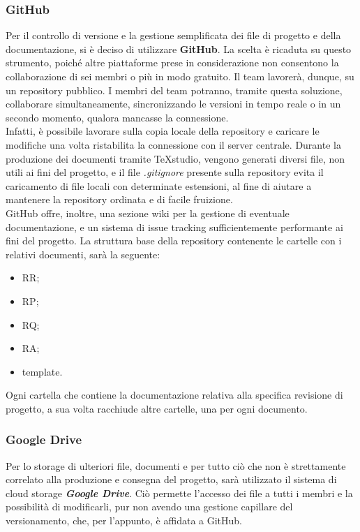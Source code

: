 		\subsubsection{GitHub}
		Per il controllo di versione e la gestione semplificata dei file di progetto e della documentazione, si è deciso di utilizzare \textbf{GitHub}. La scelta è ricaduta su questo strumento, poiché altre piattaforme prese in considerazione non consentono la collaborazione di sei membri o più in modo gratuito. Il team lavorerà, dunque, su un repository pubblico. I membri del team potranno, tramite questa soluzione, collaborare simultaneamente, sincronizzando le versioni in tempo reale o in un secondo momento, qualora mancasse la connessione.\\
		Infatti, è possibile lavorare sulla copia locale della repository e caricare le modifiche una volta ristabilita la connessione con il server centrale. Durante la produzione dei documenti tramite TeXstudio, vengono generati diversi file, non utili ai fini del progetto, e il file \textit{.gitignore} presente sulla repository evita il caricamento di file locali con determinate estensioni, al fine di aiutare a mantenere la repository ordinata e di facile fruizione.\\
		GitHub offre, inoltre, una sezione wiki per la gestione di eventuale documentazione, e un sistema di issue tracking sufficientemente performante ai fini del progetto. 
		La struttura base della repository contenente le cartelle con i relativi documenti, sarà la seguente:
		\begin{itemize}
			\item RR;
			\item RP;
			\item RQ;
			\item RA;
			\item template.
		\end{itemize}
		Ogni cartella che contiene la documentazione relativa alla specifica revisione di progetto, a sua volta racchiude altre cartelle, una per ogni documento.

		\subsubsection{Google Drive}
		Per lo storage di ulteriori file, documenti e per tutto ciò che non è strettamente correlato alla produzione e consegna del progetto, sarà utilizzato il sistema di cloud storage \textbf{\textit{Google Drive}}. Ciò permette l'accesso dei file a tutti i membri e la possibilità di modificarli, pur non avendo una gestione capillare del versionamento, che, per l'appunto, è affidata a GitHub.

